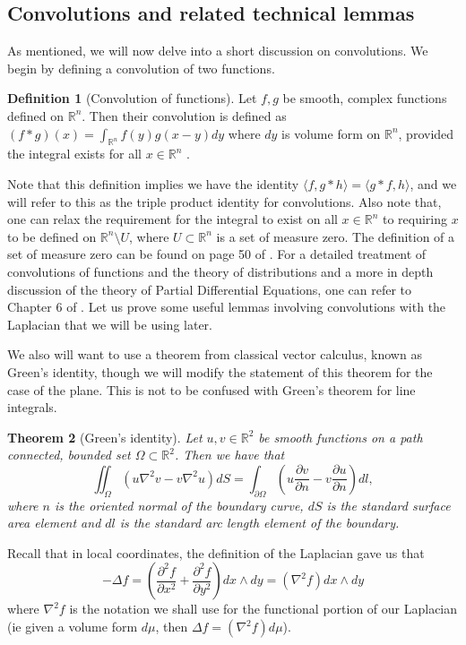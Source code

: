 \documentclass[11pt]{report}
\newtheorem{thm}{Theorem}[section]
\theoremstyle{definition}
\newtheorem{defn}[thm]{Definition}
\begin{document}
\subsection{Convolutions and related technical lemmas}
As mentioned, we will now delve into a short discussion on convolutions. We begin by defining a convolution of two functions. 
\begin{defn}[Convolution of functions]\label{ConvolutionDefn}
  Let $f,g$ be smooth, complex functions defined on $\mathbb{R}^n$. Then their convolution is defined as $(f * g)(x) = \int_{\mathbb{R}^n}f(y)g(x-y)dy$ where $dy$ is volume form on $\mathbb{R}^n$, provided the integral exists for all $x \in \mathbb{R}^n$ .
\end{defn}
Note that this definition implies we have the identity $\langle f, g*h \rangle = \langle g*f, h \rangle$, and we will refer to this as the triple product identity for convolutions. Also note that, one can relax the requirement for the integral to exist on all $x \in \mathbb{R}^n$ to requiring $x$ to be defined on $\mathbb{R}^n\setminus{U}$, where $U \subset \mathbb{R}^n$ is a set of measure zero. The definition of a set of measure zero can be found on page 50 of \cite{spivak}.
For a detailed treatment of convolutions of functions and the theory of distributions and a more in depth discussion of the theory of Partial Differential Equations, one can refer to Chapter 6 of \cite{rudin}. 
Let us prove some useful lemmas involving convolutions with the Laplacian that we will be using later. 

We also will want to use a theorem from classical vector calculus, known as Green's identity, though we will modify the statement of this theorem for the case of the plane. This is not to be confused with Green's theorem for line integrals.
\begin{thm}[Green's identity]
  Let $u,v \in \mathbb{R}^2$ be smooth functions on a path connected, bounded set $\Omega \subset \mathbb{R}^2$. Then we have that  
  \[\iint_{\Omega} (u \nabla^2 v - v \nabla^2 u) dS= \int_{\partial \Omega} \left(u \frac{\partial v}{\partial n} - v \frac{\partial u}{\partial n}\right) dl, \] 
  where $n$ is the oriented normal of the boundary curve, $dS$ is the standard surface area element and $dl$ is the standard arc length element of the boundary.
\end{thm}
Recall that in local coordinates, the definition of the Laplacian gave us that \[-\Delta f = (\frac{\partial^2 f}{\partial x^2} + \frac{\partial^2 f}{\partial y^2}) dx\wedge dy = (\nabla^2f) dx\wedge dy\]
where $\nabla^2f$ is the notation we shall use for the functional portion of our Laplacian (ie given a volume form $d\mu$, then $\Delta f = (\nabla^2 f) d\mu$).
\end{document}
